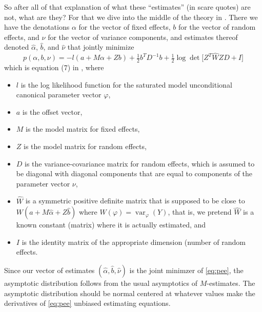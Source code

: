 \documentclass[11pt]{article}
\DeclareMathOperator{\var}{var}
\begin{document}
So after all of that explanation of what these ``estimates'' (in scare quotes)
are not, what are they?  For that we dive into the middle of the theory in
\citet[Section~2]{reaster}.  There we have the denotations $\alpha$ for
the vector of fixed effects, $b$ for the vector of random effects,
and $\nu$ for the vector of variance components, and estimates thereof
denoted $\hat{\alpha}$, $\hat{b}$, and $\hat{\nu}$ that jointly minimize
\begin{equation} \label{eq:pee}
   p(\alpha, b, \nu)
   =
   - l(a + M \alpha + Z b)
   + \tfrac{1}{2} b^T D^{-1} b
   + \tfrac{1}{2} \log
   \det\bigl[ Z^T \widehat{W} Z D + I \bigr]
\end{equation}
which is equation (7) in \citet{reaster}, where
\begin{itemize}
\item $l$ is the log likelihood function for the saturated model
    unconditional canonical parameter vector $\varphi$,
\item $a$ is the offset vector,
\item $M$ is the model matrix for fixed effects,
\item $Z$ is the model matrix for random effects,
\item $D$ is the variance-covariance matrix for random effects,
    which is assumed to be diagonal with diagonal components that
    are equal to components of the parameter vector $\nu$,
\item $\widehat{W}$ is a symmetric positive definite matrix that is supposed
    to be close to $W(a + M \hat{\alpha} + Z \hat{b})$
    where $W(\varphi) = \var_\varphi(Y)$, that is, we pretend $\widehat{W}$
    is a known constant (matrix) where it is actually estimated, and
\item $I$ is the identity matrix of the appropriate dimension (number
    of random effects.
\end{itemize}

Since our vector of estimates $(\hat{\alpha}, \hat{b}, \hat{\nu})$ is
the joint minimzer of \eqref{eq:pee}, the asymptotic distribution follows
from the usual asymptotics of $M$-estimates.  The asymptotic distribution
should be normal centered at whatever values make the derivatives of
\eqref{eq:pee} unbiased estimating equations.
\end{document}
